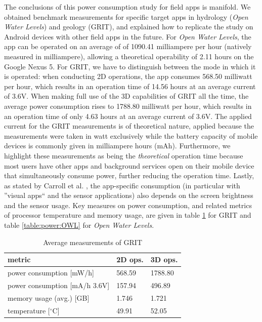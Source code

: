\documentclass[review]{elsarticle}
\begin{document}
The conclusions of this power consumption study for field apps is manifold. We obtained benchmark measurements for specific target apps in hydrology (\textit{Open Water Levels}) and geology (\gls{GRIT}), and explained how to replicate the study on Android devices with other field apps in the future. For \textit{Open Water Levels}, the app can be operated on an average of of 1090.41 milliampere per hour (natively measured in milliampere), allowing a theoretical operability of 2.11 hours on the Google Nexus 5. For \gls{GRIT}, we have to distinguish between the mode in which it is operated: when conducting 2D operations, the app consumes 568.50 milliwatt per hour, which results in an operation time of 14.56 hours at an average current of 3.6V. When making full use of the 3D capabilities of \gls{GRIT} all the time, the average power consumption rises to 1788.80 milliwatt per hour, which results in an operation time of only 4.63 hours at an average current of 3.6V. The applied current for the GRIT measurements is of theoretical nature, applied because the measurements were taken in watt exclusively while the battery capacity of mobile devices is commonly given in milliampere hours (mAh). Furthermore, we highlight these measurements as being the \textit{theoretical} operation time because most users have other apps and background services open on their mobile device that simultaneously consume power, further reducing the operation time. Lastly, as stated by Carroll et al. \cite{Carroll2010}, the app-specific consumption (in particular with ''visual apps`` and the sensor applications) also depends on the screen brightness and the sensor usage. Key measures on power consumption, and related metrics of processor temperature and memory usage, are given in table \ref{table:power:GRIT} for \gls{GRIT} and table \ref{table:power:OWL} for \textit{Open Water Levels}.

\begin{center}
\begin{longtable}[HT]{| l | p{2.5cm} | p{2.5cm} |}
	\caption{Average measurements of GRIT}
	\label{table:power:GRIT}
	\endhead
		\hline
		metric & 2D ops. & 3D ops. \\ \hline
		power consumption [mW/h] & 568.59 & 1788.80 \\ \hline
		power consumption [mA/h \@ 3.6V] & 157.94 & 496.89 \\ \hline
		memory usage (avg.) [GB] & 1.746 & 1.721 \\ \hline
		temperature [$^{\circ}$C] & 49.91 & 52.05 \\ \hline
\end{longtable}
\end{center}
\end{document}
